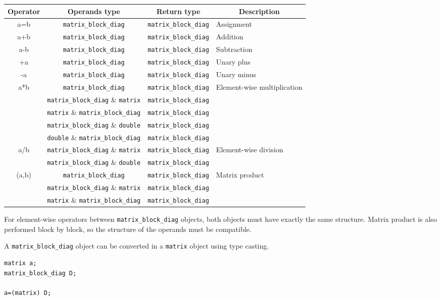 \begin{tabular}{|c|c|c|l|}
\hline
Operator&Operands type&Return type&\multicolumn{1}{|c|}{Description}\\
\hline
a=b&\verb|matrix_block_diag|&\verb|matrix_block_diag|&Assignment\\
\hline
a+b&\verb|matrix_block_diag|&\verb|matrix_block_diag|&Addition\\
\hline
a-b&\verb|matrix_block_diag|&\verb|matrix_block_diag|&Subtraction\\
\hline
+a&\verb|matrix_block_diag|&\verb|matrix_block_diag|&Unary plus\\
\hline
-a&\verb|matrix_block_diag|&\verb|matrix_block_diag|&Unary minus\\
\hline
\multirow{5}{*}{a*b}&\verb|matrix_block_diag|&\verb|matrix_block_diag|
&\multirow{5}{*}{Element-wise multiplication}\\
\cline{2-3}
&\verb|matrix_block_diag| \& \verb|matrix|&\verb|matrix_block_diag|&\\
\cline{2-3}
&\verb|matrix| \&  \verb|matrix_block_diag|&\verb|matrix_block_diag|&\\
\cline{2-3}
&\verb|matrix_block_diag| \& \verb|double|&\verb|matrix_block_diag|&\\
\cline{2-3}
&\verb|double| \& \verb|matrix_block_diag|&\verb|matrix_block_diag|&\\
\hline
\multirow{2}{*}{a/b}&\verb|matrix_block_diag| \& \verb|matrix|&\verb|matrix_block_diag|
&\multirow{2}{*}{Element-wise division}\\
\cline{2-3}
&\verb|matrix_block_diag| \& \verb|double|&\verb|matrix_block_diag|&\\
\hline
\multirow{3}{*}{(a,b)}&\verb|matrix_block_diag|&\verb|matrix_block_diag|
&\multirow{3}{*}{Matrix product}\\
\cline{2-3}
&\verb|matrix_block_diag| \& \verb|matrix|&\verb|matrix_block_diag|&\\
\cline{2-3}
&\verb|matrix| \&  \verb|matrix_block_diag|&\verb|matrix_block_diag|&\\
\hline
\end{tabular}

\medskip

For element-wise operators between \verb|matrix_block_diag| objects, both objects must have
exactly the same structure. Matrix product is also performed block by block, so the structure 
of the operands must be compatible.

A \verb|matrix_block_diag| object can be converted in a \verb|matrix| object using type casting.
\begin{verbatim}
matrix a;
matrix_block_diag D;

a=(matrix) D;
\end{verbatim}


